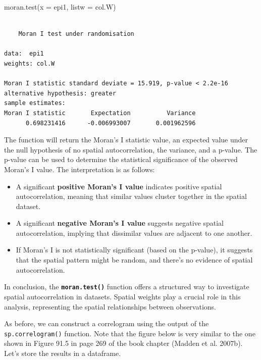 \documentclass[
  letterpaper,
]{book}
\newenvironment{Shaded}{\begin{snugshade}}{\end{snugshade}}
\newcommand{\AttributeTok}[1]{\textcolor[rgb]{0.40,0.45,0.13}{#1}}
\newcommand{\FunctionTok}[1]{\textcolor[rgb]{0.28,0.35,0.67}{#1}}
\newcommand{\NormalTok}[1]{\textcolor[rgb]{0.00,0.23,0.31}{#1}}
\begin{document}
\begin{Shaded}
\begin{Highlighting}[]
\FunctionTok{moran.test}\NormalTok{(}\AttributeTok{x =}\NormalTok{ epi1, }
           \AttributeTok{listw =}\NormalTok{ col.W)}
\end{Highlighting}
\end{Shaded}

\begin{verbatim}

    Moran I test under randomisation

data:  epi1  
weights: col.W    

Moran I statistic standard deviate = 15.919, p-value < 2.2e-16
alternative hypothesis: greater
sample estimates:
Moran I statistic       Expectation          Variance 
      0.698231416      -0.006993007       0.001962596 
\end{verbatim}

The function will return the Moran's I statistic value, an expected
value under the null hypothesis of no spatial autocorrelation, the
variance, and a p-value. The p-value can be used to determine the
statistical significance of the observed Moran's I value. The
interpretation is as follows:

\begin{itemize}
\item
  A significant \textbf{positive Moran's I value} indicates positive
  spatial autocorrelation, meaning that similar values cluster together
  in the spatial dataset.
\item
  A significant \textbf{negative Moran's I value} suggests negative
  spatial autocorrelation, implying that dissimilar values are adjacent
  to one another.
\item
  If Moran's I is not statistically significant (based on the p-value),
  it suggests that the spatial pattern might be random, and there's no
  evidence of spatial autocorrelation.
\end{itemize}

In conclusion, the \textbf{\texttt{moran.test()}} function offers a
structured way to investigate spatial autocorrelation in datasets.
Spatial weights play a crucial role in this analysis, representing the
spatial relationships between observations.

As before, we can construct a correlogram using the output of the
\texttt{sp.correlogram()} function. Note that the figure below is very
similar to the one shown in Figure 91.5 in page 269 of the book chapter
(Madden et al. 2007b). Let's store the results in a dataframe.
\end{document}

